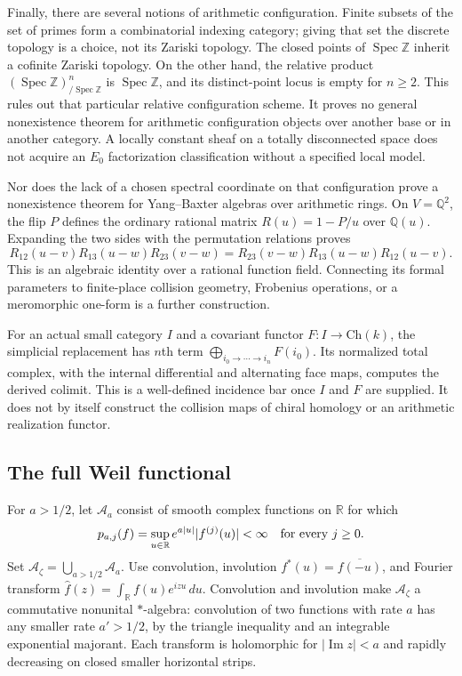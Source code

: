 Finally, there are several notions of arithmetic configuration.
Finite subsets of the set of primes form a combinatorial indexing category;
giving that set the discrete topology is a choice, not its Zariski topology.
The closed points of $\operatorname{Spec}\mathbb Z$ inherit a cofinite Zariski
topology.  On the other hand, the relative product
$(\operatorname{Spec}\mathbb Z)^n_{/\operatorname{Spec}\mathbb Z}$ is
$\operatorname{Spec}\mathbb Z$, and its distinct-point locus is empty for
$n\geq2$.  This rules out that particular relative configuration scheme.
It proves no general nonexistence theorem for arithmetic configuration
objects over another base or in another category.
A locally constant sheaf on a totally disconnected space does not acquire
an $E_0$ factorization classification without a specified local model.

Nor does the lack of a chosen spectral coordinate on that configuration
prove a nonexistence theorem for Yang--Baxter algebras over arithmetic
rings.  On $V=\mathbb Q^2$, the flip $P$ defines the ordinary rational
matrix $R(u)=1-P/u$ over $\mathbb Q(u)$.
Expanding the two sides with the permutation relations proves
\[
 R_{12}(u-v)R_{13}(u-w)R_{23}(v-w)
 =R_{23}(v-w)R_{13}(u-w)R_{12}(u-v).
\]
This is an algebraic identity over a rational function field.
Connecting its formal parameters to finite-place collision geometry,
Frobenius operations, or a meromorphic one-form is a further construction.

For an actual small category $I$ and a covariant functor $F:I\to\mathrm{Ch}(k)$,
the simplicial replacement has $n$th term
$\bigoplus_{i_0\to\cdots\to i_n}F(i_0)$.
Its normalized total complex, with the internal differential and alternating
face maps, computes the derived colimit.  This is a well-defined incidence
bar once $I$ and $F$ are supplied.  It does not by itself construct the
collision maps of chiral homology or an arithmetic realization functor.

\subsection{The full Weil functional}
\label{syn-arith:weil}
For $a>1/2$, let $\mathcal A_a$ consist of smooth complex functions on
$\mathbb R$ for which
\[
 p_{a,j}(f)=\sup_{u\in\mathbb R}e^{a|u|}|f^{(j)}(u)|<\infty
 \quad\hbox{for every }j\geq0.
\]
Set $\mathcal A_\zeta=\bigcup_{a>1/2}\mathcal A_a$.
Use convolution, involution $f^*(u)=\overline{f(-u)}$, and Fourier transform
$\widehat f(z)=\int_{\mathbb R}f(u)e^{izu}\,du$.
Convolution and involution make $\mathcal A_\zeta$ a commutative nonunital
$*$-algebra: convolution of two functions with rate $a$ has any smaller
rate $a'>1/2$, by the triangle inequality and an integrable exponential
majorant.  Each transform is holomorphic for $|\operatorname{Im}z|<a$
and rapidly decreasing on closed smaller horizontal strips.

